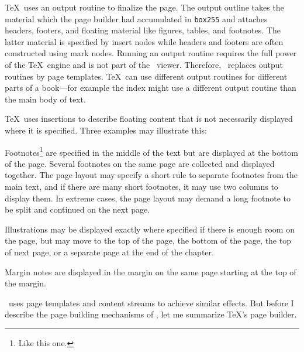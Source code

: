 \TeX\ uses an output routine to finalize the page. 
The output outline takes the material which the page builder had accumulated in {\tt box255}
and attaches headers, footers, and floating material
like figures, tables, and footnotes. The latter material is specified by insert nodes
while headers and footers are often constructed using mark nodes.
Running an output routine requires the full power of the \TeX\ engine and is not 
part of the \HINT\ viewer. Therefore, \HINT\ replaces output routines by page templates.
\TeX\ can use different output routines for different parts of a book---for example
the index might use a different output routine than the main body of text.

\TeX\ uses insertions to describe floating content that is not necessarily displayed 
where it is specified. Three examples may illustrate this:
\itemize
\item Footnotes\footnote*{Like this one.}  are specified in the middle of the text but are displayed at the
bottom of the page.  Several
footnotes on the same page are collected and displayed together. The
page layout may specify a short rule to separate footnotes from the
main text, and if there are many short footnotes, it may use two columns
to display them.  In extreme cases, the page layout may demand a long
footnote to be split and continued on the next page.

\item Illustrations may be displayed exactly where specified if there is enough
room on the page, but may move to the top of the page, the bottom of the page,
the top of next page, or a separate page at the end of the chapter.

\item Margin notes are displayed in the margin on the same page starting at the top
of the margin.
\enditemize

\HINT\ uses page templates and content streams to achieve similar effects.
But before I describe the page building mechanisms of \HINT,
let me summarize \TeX's page builder.

